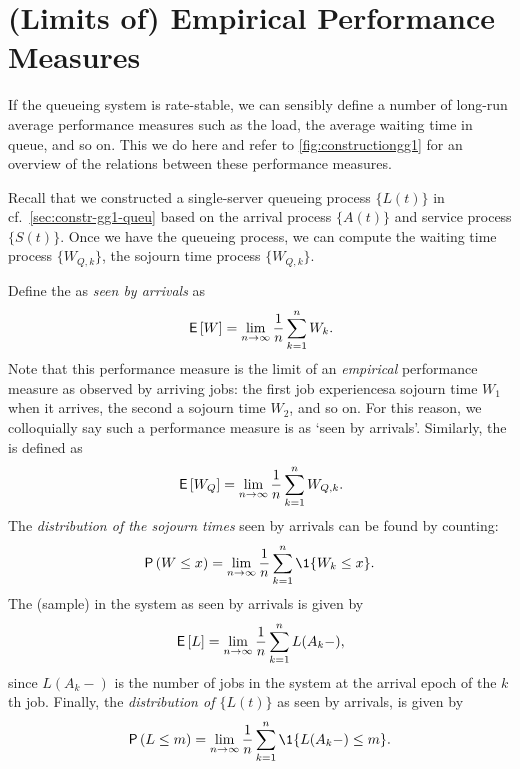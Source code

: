 \section{(Limits of) Empirical Performance Measures}
\label{sec:limits-of-emperical}

If the queueing system is rate-stable, we can sensibly define a number of long-run average performance measures such as the load, the average waiting time in queue, and so on. 
This we do here and refer to \cref{fig:constructiongg1} for an overview of the relations between these performance measures.




Recall that we constructed a single-server queueing process $\{L(t)\}$ in cf.~\cref{sec:constr-gg1-queu} based on the arrival process $\{A(t)\}$ and service process $\{S(t)\}$.
Once we have the queueing process, we can compute the waiting time process $\{W_{Q,k}\}$, the sojourn time process $\{W_{Q,k}\}$.


Define the  as \emph{seen by  arrivals} as
\begin{equation}\label{eq:49}
 \,\mathsf{E}\left[W\right] = \lim_{n\to\infty} \frac 1n\sum_{k=1}^n W_k.
\end{equation}
Note that this performance measure is the limit of an \emph{empirical} performance measure as observed by arriving jobs: the first job experiencesa sojourn time $W_1$ when it arrives, the second a sojourn time $W_2$, and so on.
For this reason, we colloquially say such a performance measure is as `seen by arrivals'.
Similarly, the  is defined as
\begin{equation}\label{eq:50}
 \,\mathsf{E}\left[W_Q\right] = \lim_{n\to\infty} \frac 1 n\sum_{k=1}^n W_{Q,k}.
\end{equation}
The \emph{distribution of the sojourn times} seen by arrivals can be found by counting:
\begin{equation}\label{eq:48}
 \P{W \leq x} = \lim_{n\to\infty} \frac 1n\sum_{k=1}^n \1{W_k\leq x}.
\end{equation}
The (sample)  in the system as seen by arrivals is given by
\begin{equation}\label{eq:EQ}
\,\mathsf{E}\left[L\right] = \lim_{n\to\infty}\frac 1 n \sum_{k=1}^n L(A_k-),
\end{equation}
since $L(A_k-)$ is the number of jobs in the system at the arrival epoch of the $k$th job.
Finally, the \emph{distribution of $\{L(t)\}$} as seen by arrivals, is given by
\begin{equation}\label{eq:Qm}
\P{L\leq m} = \lim_{n\to\infty} \frac 1 n \sum_{k=1}^n \1{L(A_k-) \leq m}.
\end{equation}



